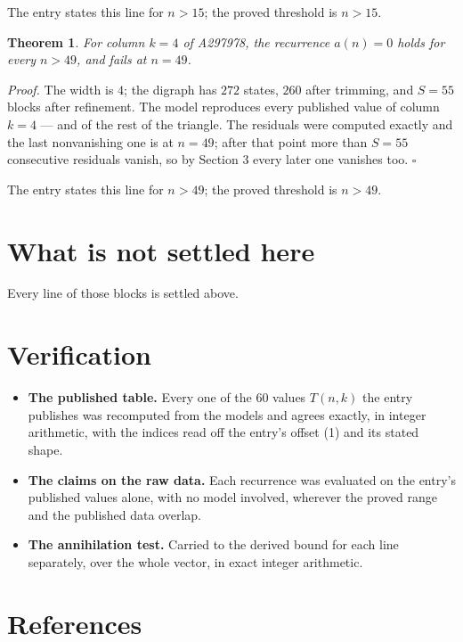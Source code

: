 \documentclass[11pt]{article}
\newtheorem{theorem}{Theorem}
\theoremstyle{definition}
\begin{document}
The entry states this line for $n > 15$; the proved threshold is $n > 15$.

\begin{theorem} For column $k = 4$ of A297978, the recurrence $a(n) = 0$ holds for every $n > 49$, and fails at $n = 49$.\end{theorem}

{\itshape Proof.} The width is $4$; the digraph has $272$ states, $260$ after trimming, and $S = 55$ blocks after refinement. The model reproduces every published value of column $k = 4$ --- and of the rest of the triangle. The residuals were computed exactly and the last nonvanishing one is at $n = 49$; after that point more than $S = 55$ consecutive residuals vanish, so by Section 3 every later one vanishes too. $\square$

The entry states this line for $n > 49$; the proved threshold is $n > 49$.

\section{What is not settled here}

Every line of those blocks is settled above.

\section{Verification}

\begin{itemize}

\item {\bfseries The published table.} Every one of the 60 values $T(n,k)$ the entry publishes was recomputed from the models and agrees exactly, in integer arithmetic, with the indices read off the entry's offset (1) and its stated shape.

\item {\bfseries The claims on the raw data.} Each recurrence was evaluated on the entry's published values alone, with no model involved, wherever the proved range and the published data overlap.

\item {\bfseries The annihilation test.} Carried to the derived bound for each line separately, over the whole vector, in exact integer arithmetic.

\end{itemize}

\section{References}
\end{document}
